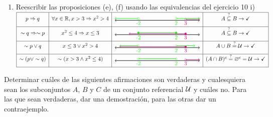 \documentclass[12pt,a4paper, spanish]{article}
\begin{document}
\begin{enumerate}[label=\roman*)]
	\item Reescribir las proposiciones (e), (f) usando las equivalencias del ejercicio 10 i)\\
	      $
		      \begin{array}{|c|c|c|c|}
			      \hline
			      p \entonces q           & \paratodo x \en \reales, x > 3 \entonces x^2 > 4 & \doceiiicero & A \stacktext{?}{\subseteq} B \to \checkmark                     \\
			      \hline
			      \sim q \entonces \sim p & x^2 \leq 4 \entonces x \leq 3                    & \doceiiiuno  & A \stacktext{?}{\subseteq} B \to \checkmark                     \\
			      \hline
			      \sim p \lor q           & x \leq 3 \o x^2 > 4                              & \doceiiidos  & A \union B \stackrel{?}{=} \universo \to \checkmark             \\
			      \hline
			      \sim (p \lor \sim q)    & \sim (x > 3 \y x^2 \leq 4 )                      & \doceiiitres & (A \inter B)^c \stackrel{?}{=}\vacio^c=\universo \to \checkmark \\
			      \hline
		      \end{array}
	      $
\end{enumerate}

\ejercicio Determinar cuáles de las siguientes afirmaciones son verdaderas y cualesquiera sean los subconjuntos $A$, $B$ y $C$ de un conjunto referencial $\mathcal U$ y cuáles no.
Para las que sean verdaderas, dar una demostración, para las otras dar un contraejemplo.
\end{document}
